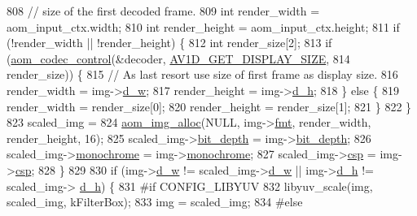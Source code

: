 \begin{DoxyCodeInclude}
{{{{{{{{{{{{{{{{{{{{{{{{{{{{{{{{{{{{{{{{{{{{{808             \textcolor{comment}{// size of the first decoded frame.}
809             \textcolor{keywordtype}{int} render\_width = aom\_input\_ctx.width;
810             \textcolor{keywordtype}{int} render\_height = aom\_input\_ctx.height;
811             \textcolor{keywordflow}{if} (!render\_width || !render\_height) \{
812               \textcolor{keywordtype}{int} render\_size[2];
813               \textcolor{keywordflow}{if} (\hyperlink{group__codec_ga6da974f4eeaba1fa74106b28d0fe6ac5}{aom\_codec\_control}(&decoder, 
      \hyperlink{group__aom__decoder_gga3865fd4b3192489baa9a5c3632ebe97ba592a5d1390204d743ddfe7bfe8ef177c}{AV1D\_GET\_DISPLAY\_SIZE},
814                                     render\_size)) \{
815                 \textcolor{comment}{// As last resort use size of first frame as display size.}
816                 render\_width = img->\hyperlink{structaom__image_a89f80b1f58d608b9d2080635f4359034}{d\_w};
817                 render\_height = img->\hyperlink{structaom__image_ab986419a1f0fff93a2dc505f47194988}{d\_h};
818               \} \textcolor{keywordflow}{else} \{
819                 render\_width = render\_size[0];
820                 render\_height = render\_size[1];
821               \}
822             \}
823             scaled\_img =
824                 \hyperlink{aom__image_8h_a570db29fbd122951235a08fe9375f6bb}{aom\_img\_alloc}(NULL, img->\hyperlink{structaom__image_a6c64b1ab918d80d52eb8f5d6d957e825}{fmt}, render\_width, render\_height, 16);
825             scaled\_img->\hyperlink{structaom__image_a46ed9ffd741938d306a0db5a24bdcf8e}{bit\_depth} = img->\hyperlink{structaom__image_a46ed9ffd741938d306a0db5a24bdcf8e}{bit\_depth};
826             scaled\_img->\hyperlink{structaom__image_ab7886616025ff8bd0bb96d967fca9ad8}{monochrome} = img->\hyperlink{structaom__image_ab7886616025ff8bd0bb96d967fca9ad8}{monochrome};
827             scaled\_img->\hyperlink{structaom__image_a4f235c521bc95a061e9e0b2a3d5d457e}{csp} = img->\hyperlink{structaom__image_a4f235c521bc95a061e9e0b2a3d5d457e}{csp};
828           \}
829 
830           \textcolor{keywordflow}{if} (img->\hyperlink{structaom__image_a89f80b1f58d608b9d2080635f4359034}{d\_w} != scaled\_img->\hyperlink{structaom__image_a89f80b1f58d608b9d2080635f4359034}{d\_w} || img->\hyperlink{structaom__image_ab986419a1f0fff93a2dc505f47194988}{d\_h} != scaled\_img->
      \hyperlink{structaom__image_ab986419a1f0fff93a2dc505f47194988}{d\_h}) \{
831 \textcolor{preprocessor}{#if CONFIG\_LIBYUV}
832             libyuv\_scale(img, scaled\_img, kFilterBox);
833             img = scaled\_img;
834 \textcolor{preprocessor}{#else}
}}}}}}}}}}}}}}}}}}}}}}}}}}}}}}}}}}}}}}}}}}}}}
\end{DoxyCodeInclude}

